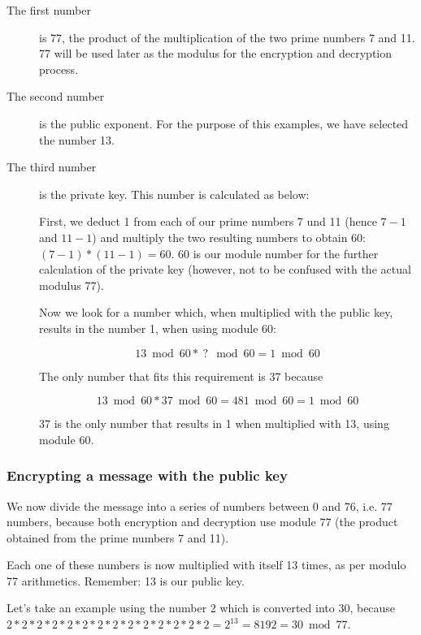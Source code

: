 \documentclass[a4paper,11pt,oneside,openright,titlepage]{scrbook}
\begin{document}
\begin{description}
\item [The first number] is 77, the product of the multiplication of
    the two prime numbers 7 and 11. 77 will be used later as the
    modulus for the encryption and decryption process.

\item [The second number] is the public exponent. For the purpose of
    this examples, we have selected the number 13.

\item [The third number] is the private key. This number is calculated
    as below:

    First, we deduct 1 from each of our prime numbers 7 und 11 (hence
    $7 - 1$ and $11 - 1$) and multiply the two resulting numbers to
    obtain 60: $( 7 - 1 ) * ( 11 - 1) = 60$. 60 is our module number
    for the further calculation of the private key (however, not to be
    confused with the actual modulus 77).

    Now we look for a number which, when multiplied with the public
    key, results in the number 1, when using module 60:

    \[ 13 \bmod 60 *~?~\bmod 60 = 1 \bmod 60 \]

    The only number that fits this requirement is 37 because

    \[ 13 \bmod 60 * 37 \bmod 60 = 481 \bmod 60 = 1 \bmod 60 \]

    37 is the only number that results in 1 when multiplied with 13, using module 60.

\end{description}


\clearpage
\subsubsection{Encrypting a message with the public key}

We now divide the message into a series of numbers between 0 and 76,
i.e. 77 numbers, because both encryption and decryption use module 77
(the product obtained from the prime numbers 7 and 11).

Each one of these numbers is now multiplied with itself 13 times, as
per modulo 77 arithmetics. Remember: 13 is our public key.

Let's take an example using the number 2 which is converted into 30, because
 $ 2 * 2 * 2 * 2 * 2 * 2 * 2 * 2 * 2 * 2 * 2 * 2 * 2 * 2
 = 2^{13} = 8192 = 30 \bmod 77 $.
\end{document}
